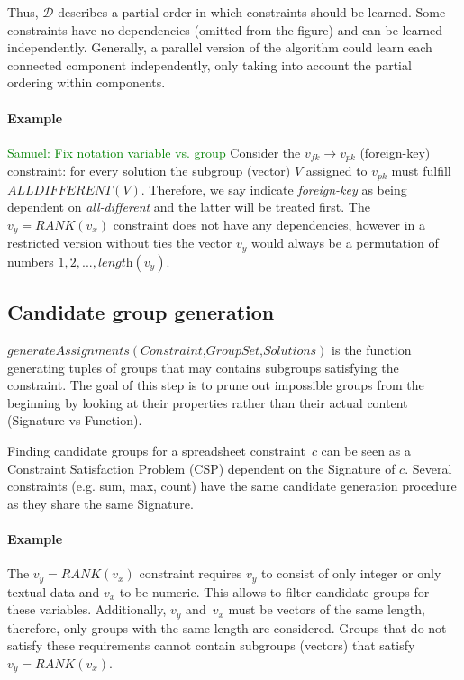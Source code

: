 \documentclass{ecai}
\newcommand{\samuel}[1]{\textcolor{green}{{\sc Samuel:} #1}\xspace}
\newcommand{\format}[1]{\textit{#1}\xspace}
\newcommand{\generategroups}{\format{generateAssignments}}
\newcommand{\CSignature}{Signature\xspace}
\newcommand{\CFunction}{Function\xspace}
\newcommand{\dependencies}{\ensuremath{\mathcal{D}}\xspace}
\newcommand{\eccalc}[2]{\ensuremath{#1 = #2}}
\newcommand{\ecrank}[2]{\eccalc{#1}{\mathit{RANK}(#2)}}
\newcommand{\ecfkey}[2]{\ensuremath{#1 \rightarrow #2}}
\newcommand{\ecalldiff}[1]{\ensuremath{\mathit{ALLDIFFERENT}(#1)}}
\begin{document}
Thus, \dependencies describes a partial order in which constraints should be learned.
Some constraints have no dependencies (omitted from the figure) and can be learned independently.
Generally, a parallel version of the algorithm could learn each connected component independently, only taking into account the partial ordering within components.

\paragraph{Example}
\samuel{Fix notation variable vs. group}
Consider the \ecfkey{v_{fk}}{v_{pk}} (foreign-key) constraint: for every solution the subgroup (vector) $V$ assigned to $\mathit{v_{pk}}$ must fulfill \ecalldiff{V}.
Therefore, we say indicate \textit{foreign-key} as being dependent on \textit{all-different} and the latter will be treated first.
The \ecrank{v_y}{v_x} constraint does not have any dependencies, however in a restricted version without ties the vector $v_y$ would always be a permutation of numbers $1, 2, ..., \textit{length}(v_y)$.

\subsection{Candidate group generation}
$\generategroups(\textit{Constraint,GroupSet,Solutions})$ is the function generating tuples of groups that may contains subgroups satisfying the constraint.
The goal of this step is to prune out impossible groups from the beginning by looking at their properties rather than their actual content (\CSignature vs \CFunction).

Finding candidate groups for a spreadsheet constraint~$c$ can be seen as a Constraint Satisfaction Problem (CSP) dependent on the \CSignature of $c$.
Several constraints (e.g. sum, max, count) have the same candidate generation procedure as they share the same \CSignature.

\paragraph{Example}
The \ecrank{v_y}{v_x} constraint requires $v_y$ to consist of only integer or only textual data and $v_x$ to be numeric.
This allows to filter candidate groups for these variables.
Additionally, $v_y$ and~$v_x$ must be vectors of the same length, therefore, only groups with the same length are considered.
Groups that do not satisfy these requirements cannot contain subgroups (vectors) that satisfy \ecrank{v_y}{v_x}.
\end{document}
